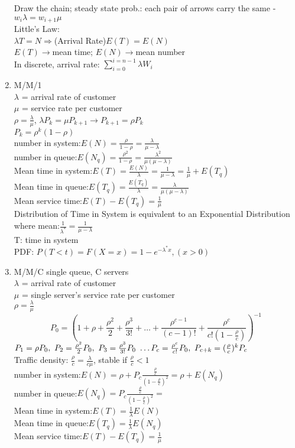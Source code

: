 \documentclass[10pt]{article}
\begin{document}
\begin{multicols}{2}
\begin{enumerate}
	Draw the chain; 
	steady state prob.: each pair of arrows carry the same - $w_i\lambda = w_{i+1}\mu$\\
	Little's Law:\\
	$\lambda T = N\Rightarrow$(Arrival Rate)$E(T) = E(N)$\\
	$E(T)\rightarrow$mean time; $E(N)\rightarrow$mean number\\
	In discrete, arrival rate: $\sum_{i = 0}^{i = n - 1} \lambda W_i$
	\item M/M/1\\
	$\lambda$ = arrival rate of customer\\
	$\mu$ = service rate per customer\\
	$\rho = \frac{\lambda}{\mu}$, $\lambda P_k = \mu P_{k+1}\rightarrow P_{k+1} = \rho P_k$\\
	$P_k = \rho^k(1-\rho)$\\
	number in system:$E(N) = \frac{\rho}{1-\rho} = \frac{\lambda}{\mu - \lambda}$\\
	number in queue:$E(N_q) = \frac{\rho^2}{1-\rho} = \frac{\lambda^2}{\mu(\mu-\lambda)}$\\
	Mean time in system:$E(T) = \frac{E(N)}{\lambda} = \frac{1}{\mu-\lambda}= \frac{1}{\mu} + E(T_q)$\\
	Mean time in queue:$E(T_q) = \frac{E(T_q)}{\lambda} = \frac{\lambda}{\mu(\mu-\lambda)}$\\
	Mean service time:$E(T) - E(T_q) = \frac{1}{\mu}$\\
	Distribution of Time in System is equivalent to an Exponential Distribution where mean:$\frac{1}{\lambda^*} = \frac{1}{\mu - \lambda}$\\
	T: time in system\\
	PDF: $P(T<t) = F(X = x) = 1-e^{-\lambda^* x}, (x > 0)$
	
	\item M/M/C single queue, C servers\\
	$\lambda$ = arrival rate of customer\\
	$\mu$ = single server's service rate per customer\\
	$\rho = \frac{\lambda}{\mu}$\\
	$$P_0 = (1+\rho+\frac{\rho^2}{2}+\frac{\rho^3}{3!}+\dots+\frac{\rho^{c-1}}{(c-1)!}+\frac{\rho^c}{c!(1-\frac{\rho}{c})})^{-1}$$
	$P_1 = \rho P_0, \ P_2 = \frac{\rho^2}{2}P_0, \ P_3 = \frac{\rho^3}{3!}P_0 \ \dots \\ P_c = \frac{\rho^c}{c!}P_0, \ P_{c+k} = (\frac{\rho}{c})^k P_c$\\
	Traffic density: $\frac{\rho}{c} = \frac{\lambda}{c\mu}$, stable if $\frac{\rho}{c} < 1$\\
	number in system:$E(N) = \rho + P_c\frac{\frac{\rho}{c}}{(1-\frac{\rho}{c})^2} = \rho + E(N_q)$\\
	number in queue:$E(N_q) = P_c\frac{\frac{\rho}{c}}{(1-\frac{\rho}{c})^2} =$\\
	Mean time in system:$E(T) =\frac{1}{\lambda}E(N)$\\
	Mean time in queue:$E(T_q) = \frac{1}{\lambda}E(N_q)$\\
	Mean service time:$E(T) - E(T_q) = \frac{1}{\mu}$
	

\end{enumerate}
\end{multicols}
\end{document}
